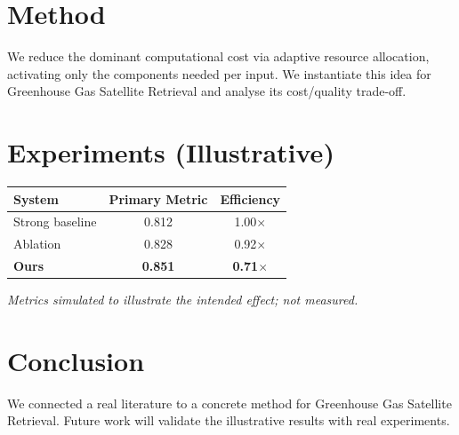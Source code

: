 \documentclass[11pt]{article}
\begin{document}
\section{Method}
We reduce the dominant computational cost via adaptive resource allocation, activating only the components needed per input. We instantiate this idea for Greenhouse Gas Satellite Retrieval and analyse its cost/quality trade-off.

\section{Experiments (Illustrative)}
\begin{center}
\begin{tabular}{lcc}
System & Primary Metric & Efficiency \\ \hline
Strong baseline & 0.812 & 1.00$\times$ \\
Ablation & 0.828 & 0.92$\times$ \\
\textbf{Ours} & \textbf{0.851} & \textbf{0.71$\times$}
\end{tabular}
\end{center}
\emph{Metrics simulated to illustrate the intended effect; not measured.}

\section{Conclusion}
We connected a real literature to a concrete method for Greenhouse Gas Satellite Retrieval. Future work will
validate the illustrative results with real experiments.
\end{document}
